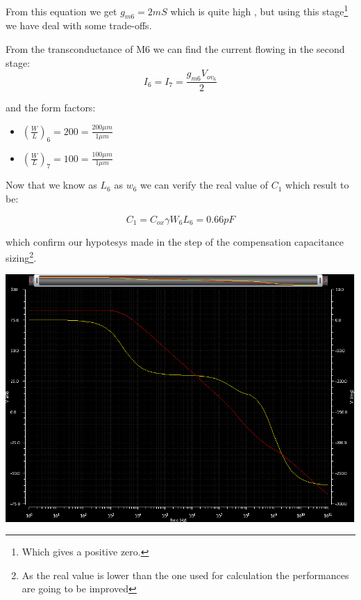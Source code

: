 From this equation we get $g_{m6} = 2mS $ which is quite high , but using this stage\footnote{Which gives a positive zero.} we have deal with some trade-offs.

From the transconductance of M6 we can find the current flowing in the second stage:
\begin{equation}
  I_6=I_7= \frac{g_{m6}V_{ov_6}}{2}
\end{equation}

and the form factors:

\begin{itemize}
    \item $(\frac{W}{L})_6=200=\frac{200 \mu m}{1 \mu m}$
 
    \item $(\frac{W}{L})_7=100=\frac{100 \mu m}{1 \mu m}$
    
  \end{itemize}  

Now that we know as $L_6$ as $w_6$ we can verify the real value of $C_1$ which result to be:

\begin{equation}
  C_1 = C_{ox} \gamma W_6 L_6 = 0.66pF
\end{equation}

which confirm our hypotesys made in the step of the compensation capacitance sizing\footnote{As the real value is lower than the one used for calculation the performances are going to be improved}.

\centering
\includegraphics[width=1\textwidth]{Capitoli/gainph1.png}
\raggedright



